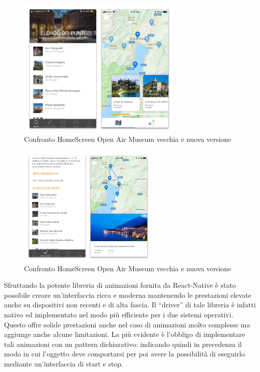 \begin{figure}[h]
\centering
\includegraphics[width=0.7\textwidth]{images/punti.png}
\caption{Confronto HomeScreen Open Air Museum vecchia e nuova versione}
\end{figure}

\begin{figure}[h]
\centering
\includegraphics[width=0.6\textwidth]{images/percorsi.png}
\caption{Confronto HomeScreen Open Air Museum vecchia e nuova versione}
\end{figure}\vspace{19mm}

Sfruttando la potente libreria di animazioni fornita da React-Native è stato possibile creare un'interfaccia ricca e moderna mantenendo le prestazioni elevate anche su dispositivi non recenti e di alta fascia. Il “driver” di tale libreria è infatti nativo ed implementato nel modo più efficiente per i due sistemi operativi. Questo offre solide prestazioni anche nel caso di animazioni molto complesse ma aggiunge anche alcune limitazioni. La più evidente è l’obbligo di implementare tali animazioni con un pattern dichiarativo: indicando quindi in precedenza il modo in cui l’oggetto deve comportarsi per poi avere la possibilità di eseguirlo mediante un'interfaccia di start e stop.

